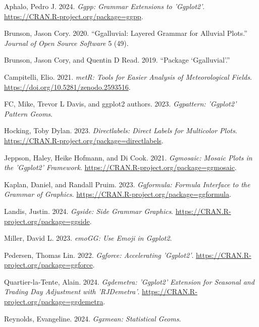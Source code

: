 \documentclass[
  letterpaper,
  DIV=11,
  numbers=noendperiod]{scrreprt}
\newlength{\cslhangindent}
\newenvironment{CSLReferences}[2] %
 {\begin{list}{}{%
  \setlength{\itemindent}{0pt}
  \setlength{\leftmargin}{0pt}
  \setlength{\parsep}{0pt}
  \ifodd #1
   \setlength{\leftmargin}{\cslhangindent}
   \setlength{\itemindent}{-1\cslhangindent}
  \fi
  \setlength{\itemsep}{#2\baselineskip}}}
 {\end{list}}
\begin{document}
\begin{CSLReferences}{1}{0}
Aphalo, Pedro J. 2024. \emph{Ggpp: Grammar Extensions to 'Ggplot2'}.
\url{https://CRAN.R-project.org/package=ggpp}.

Brunson, Jason Cory. 2020. {``Ggalluvial: Layered Grammar for Alluvial
Plots.''} \emph{Journal of Open Source Software} 5 (49).

Brunson, Jason Cory, and Quentin D Read. 2019. {``Package
{`Ggalluvial'}.''}

Campitelli, Elio. 2021. \emph{metR: Tools for Easier Analysis of
Meteorological Fields}. \url{https://doi.org/10.5281/zenodo.2593516}.

FC, Mike, Trevor L Davis, and ggplot2 authors. 2023. \emph{Ggpattern:
'Ggplot2' Pattern Geoms}.

Hocking, Toby Dylan. 2023. \emph{Directlabels: Direct Labels for
Multicolor Plots}.
\url{https://CRAN.R-project.org/package=directlabels}.

Jeppson, Haley, Heike Hofmann, and Di Cook. 2021. \emph{Ggmosaic: Mosaic
Plots in the 'Ggplot2' Framework}.
\url{https://CRAN.R-project.org/package=ggmosaic}.

Kaplan, Daniel, and Randall Pruim. 2023. \emph{Ggformula: Formula
Interface to the Grammar of Graphics}.
\url{https://CRAN.R-project.org/package=ggformula}.

Landis, Justin. 2024. \emph{Ggside: Side Grammar Graphics}.
\url{https://CRAN.R-project.org/package=ggside}.

Miller, David L. 2023. \emph{emoGG: Use Emoji in Ggplot2}.

Pedersen, Thomas Lin. 2022. \emph{Ggforce: Accelerating 'Ggplot2'}.
\url{https://CRAN.R-project.org/package=ggforce}.

Quartier-la-Tente, Alain. 2024. \emph{Ggdemetra: 'Ggplot2' Extension for
Seasonal and Trading Day Adjustment with 'RJDemetra'}.
\url{https://CRAN.R-project.org/package=ggdemetra}.

Reynolds, Evangeline. 2024. \emph{Ggxmean: Statistical Geoms}.


\end{CSLReferences}
\end{document}
